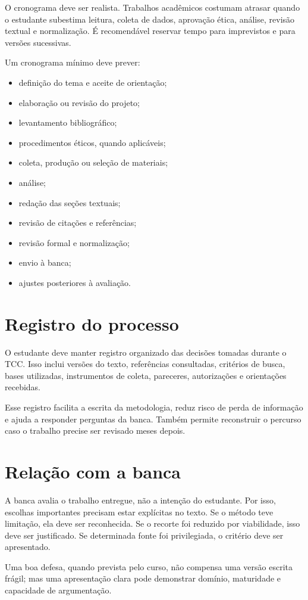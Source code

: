 O cronograma deve ser realista. Trabalhos acadêmicos costumam atrasar quando o estudante subestima leitura, coleta de dados, aprovação ética, análise, revisão textual e normalização. É recomendável reservar tempo para imprevistos e para versões sucessivas.

Um cronograma mínimo deve prever:

\begin{itemize}
  \item definição do tema e aceite de orientação;
  \item elaboração ou revisão do projeto;
  \item levantamento bibliográfico;
  \item procedimentos éticos, quando aplicáveis;
  \item coleta, produção ou seleção de materiais;
  \item análise;
  \item redação das seções textuais;
  \item revisão de citações e referências;
  \item revisão formal e normalização;
  \item envio à banca;
  \item ajustes posteriores à avaliação.
\end{itemize}


\section{Registro do processo}

O estudante deve manter registro organizado das decisões tomadas durante o TCC. Isso inclui versões do texto, referências consultadas, critérios de busca, bases utilizadas, instrumentos de coleta, pareceres, autorizações e orientações recebidas.

Esse registro facilita a escrita da metodologia, reduz risco de perda de informação e ajuda a responder perguntas da banca. Também permite reconstruir o percurso caso o trabalho precise ser revisado meses depois.

\section{Relação com a banca}

A banca avalia o trabalho entregue, não a intenção do estudante. Por isso, escolhas importantes precisam estar explícitas no texto. Se o método teve limitação, ela deve ser reconhecida. Se o recorte foi reduzido por viabilidade, isso deve ser justificado. Se determinada fonte foi privilegiada, o critério deve ser apresentado.

Uma boa defesa, quando prevista pelo curso, não compensa uma versão escrita frágil; mas uma apresentação clara pode demonstrar domínio, maturidade e capacidade de argumentação.
